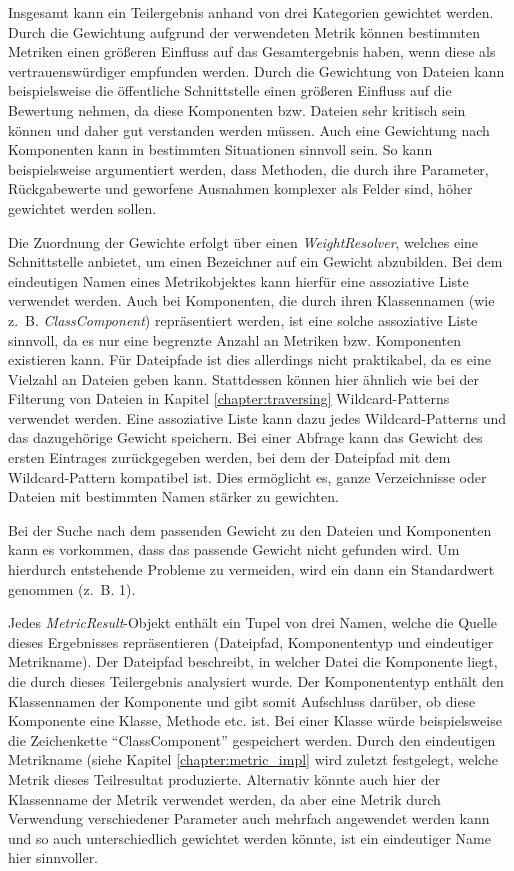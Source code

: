Insgesamt kann ein Teilergebnis anhand von drei Kategorien gewichtet werden. Durch die Gewichtung aufgrund der verwendeten Metrik können bestimmten Metriken einen größeren Einfluss auf das Gesamtergebnis haben, wenn diese als vertrauenswürdiger empfunden werden. Durch die Gewichtung von Dateien kann beispielsweise die öffentliche Schnittstelle einen größeren Einfluss auf die Bewertung nehmen, da diese Komponenten bzw. Dateien sehr kritisch sein können und daher gut verstanden werden müssen. Auch eine Gewichtung nach Komponenten kann in bestimmten Situationen sinnvoll sein. So kann beispielsweise argumentiert werden, dass Methoden, die durch ihre Parameter, Rückgabewerte und geworfene Ausnahmen komplexer als Felder sind, höher gewichtet werden sollen.

Die Zuordnung der Gewichte erfolgt über einen \textit{WeightResolver}, welches eine Schnittstelle anbietet, um einen Bezeichner auf ein Gewicht abzubilden. Bei dem eindeutigen Namen eines Metrikobjektes kann hierfür eine assoziative Liste verwendet werden. Auch bei Komponenten, die durch ihren Klassennamen (wie z.~B. \textit{ClassComponent}) repräsentiert werden, ist  eine solche assoziative Liste sinnvoll, da es nur eine begrenzte Anzahl an Metriken bzw. Komponenten existieren kann.
Für Dateipfade ist dies allerdings nicht praktikabel, da es eine Vielzahl an Dateien geben kann. Stattdessen können hier ähnlich wie bei der Filterung von Dateien in Kapitel \ref{chapter:traversing} Wildcard-Patterns verwendet werden. Eine assoziative Liste kann dazu jedes Wildcard-Patterns und das dazugehörige Gewicht speichern. Bei einer Abfrage kann das Gewicht des ersten Eintrages zurückgegeben werden, bei dem der Dateipfad mit dem Wildcard-Pattern kompatibel ist. Dies ermöglicht es, ganze Verzeichnisse oder Dateien mit bestimmten Namen stärker zu gewichten. 

Bei der Suche nach dem passenden Gewicht zu den Dateien und Komponenten kann es vorkommen, dass das passende Gewicht nicht gefunden wird. Um hierdurch entstehende Probleme zu vermeiden, wird ein dann ein Standardwert genommen (z.~B. 1). 

Jedes \textit{MetricResult}-Objekt enthält ein Tupel von drei Namen, welche die Quelle dieses Ergebnisses repräsentieren (Dateipfad, Komponententyp und eindeutiger Metrikname). Der Dateipfad beschreibt, in welcher Datei die Komponente liegt, die durch dieses Teilergebnis analysiert wurde. Der Komponententyp enthält den Klassennamen der Komponente und gibt somit Aufschluss darüber, ob diese Komponente eine Klasse, Methode etc. ist. Bei einer Klasse würde beispielsweise die Zeichenkette \enquote{ClassComponent} gespeichert werden. Durch den eindeutigen Metrikname (siehe Kapitel \ref{chapter:metric_impl} wird zuletzt festgelegt, welche Metrik dieses Teilresultat produzierte. Alternativ könnte auch hier der Klassenname der Metrik verwendet werden, da aber eine Metrik durch Verwendung verschiedener Parameter auch mehrfach angewendet werden kann und so auch unterschiedlich gewichtet werden könnte, ist ein eindeutiger Name hier sinnvoller.

